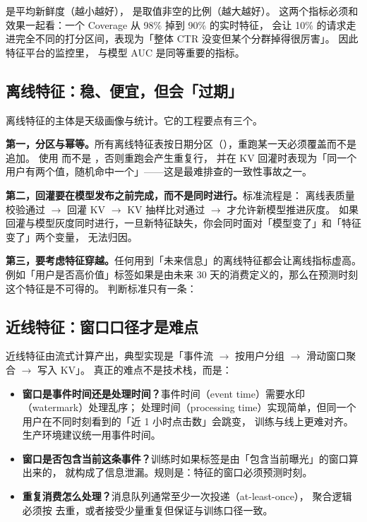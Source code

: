  是平均新鲜度（越小越好）， 是取值非空的比例（越大越好）。
这两个指标必须和效果一起看：一个 Coverage 从 98\% 掉到 90\% 的实时特征，
会让 10\% 的请求走进完全不同的打分区间，表现为「整体 CTR 没变但某个分群掉得很厉害」。
因此特征平台的监控里， 与模型 AUC 是同等重要的指标。

\subsection{离线特征：稳、便宜，但会「过期」}

离线特征的主体是天级画像与统计。它的工程要点有三个。

\textbf{第一，分区与幂等。}所有离线特征表按日期分区（），重跑某一天必须覆盖而不是追加。
使用  而不是 ，否则重跑会产生重复行，
并在 KV 回灌时表现为「同一个用户有两个值，随机命中一个」——这是最难排查的一致性事故之一。

\textbf{第二，回灌要在模型发布之前完成，而不是同时进行。}标准流程是：
离线表质量校验通过 $\to$ 回灌 KV $\to$ KV 抽样比对通过 $\to$ 才允许新模型推进灰度。
如果回灌与模型灰度同时进行，一旦新特征缺失，你会同时面对「模型变了」和「特征变了」两个变量，
无法归因。

\textbf{第三，要考虑特征穿越。}任何用到「未来信息」的离线特征都会让离线指标虚高。
例如「用户是否高价值」标签如果是由未来 30 天的消费定义的，那么在预测时刻这个特征是不可得的。
判断标准只有一条：

\subsection{近线特征：窗口口径才是难点}

近线特征由流式计算产出，典型实现是「事件流 $\to$ 按用户分组 $\to$ 滑动窗口聚合 $\to$ 写入 KV」。
真正的难点不是技术栈，而是：

\begin{itemize}
  \item \textbf{窗口是事件时间还是处理时间？}事件时间（event time）需要水印（watermark）处理乱序；
        处理时间（processing time）实现简单，但同一个用户在不同时刻看到的「近 1 小时点击数」会跳变，
        训练与线上更难对齐。生产环境建议统一用事件时间。
  \item \textbf{窗口是否包含当前这条事件？}训练时如果标签是由「包含当前曝光」的窗口算出来的，
        就构成了信息泄漏。规则是：特征的窗口必须预测时刻。
  \item \textbf{重复消费怎么处理？}消息队列通常至少一次投递（at-least-once），
        聚合逻辑必须按  去重，或者接受少量重复但保证与训练口径一致。
\end{itemize}


